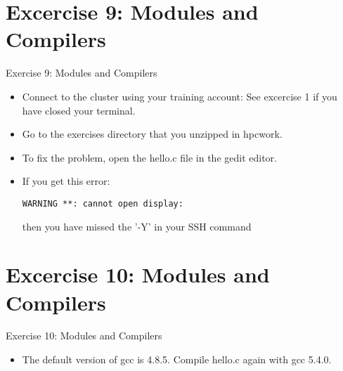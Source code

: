 \section{Excercise 9: Modules and Compilers}
\begin{frame}[fragile]{Exercise 9: Modules and Compilers}
\begin{itemize}
\item{Connect to the cluster using your training account: See excercise 1 if you have closed your terminal.}
\item{Go to the \alert{exercises} directory that you unzipped in hpcwork.}
\item{To fix the problem, open the \alert{hello.c} file in the \alert{gedit} editor.}
\item{If you get this error: \begin{verbatim}WARNING **: cannot open display:\end{verbatim} then you have missed the '-Y' in your SSH command}
\end{itemize}
\end{frame}
 
\section{Excercise 10: Modules and Compilers}
\begin{frame}[fragile]{Exercise 10: Modules and Compilers}
\begin{itemize} 
\item{The default version of gcc is 4.8.5. Compile hello.c again with \alert{gcc 5.4.0}.}
\end{itemize}
\end{frame}

